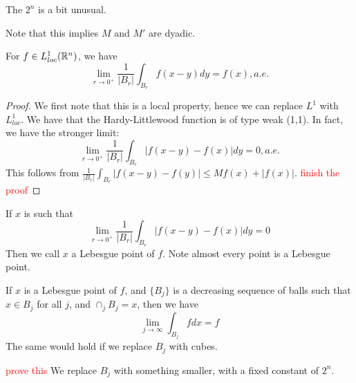 \begin{note}
    The $2^n$ is a bit unusual. 
\end{note}
Note that this implies $M$ and $M'$ are dyadic.

\begin{corollary}
    For $f\in L_{loc}^1(\mathbb{R}^n)$, we have
    \begin{equation*}
        \lim_{r\to 0^+}\frac{1}{|B_r|}\int_{B_r}f(x-y)dy=f(x), a.e.
    \end{equation*}
\end{corollary}
\begin{proof}
    We first note that this is a local property, hence we can replace $L^1$ with $L_{loc}^1$. We have that the Hardy-Littlewood function is of type weak (1,1). In fact, we have the stronger limit:
    \begin{equation*}
        \lim_{r\to 0^+}\frac{1}{|B_r|}\int_{B_r}|f(x-y)-f(x)|dy=0, a.e.
    \end{equation*}
    This follows from $\frac{1}{|B_r|}\int_{B_r}|f(x-y)-f(y)|\leq Mf(x)+|f(x)|$. 
    \textcolor{red}{finish the proof}
\end{proof}

\begin{definition}
    If $x$ is such that 
    \begin{equation*}
        \lim_{r\to 0^+}\frac{1}{|B_r|}\int_{B_r}|f(x-y)-f(x)|dy=0
    \end{equation*}
    Then we call $x$ a Lebesgue point of $f$. Note almost every point is a Lebesgue point.
\end{definition}
\begin{proposition}
    If $x$ is a Lebesgue point of $f$, and $\{B_j\}$ is a decreasing sequence of balls such that $x\in B_j$ for all $j$, and $\cap_jB_j=x$, then we have
    \begin{equation*}
        \lim_{j\to\infty}\int_{B_j}fdx=f
    \end{equation*}
    The same would hold if we replace $B_j$ with cubes.
\end{proposition}
\begin{remark}
    \textcolor{red}{prove this} We replace $B_j$ with something smaller, with a fixed constant of $2^n$.
\end{remark}

